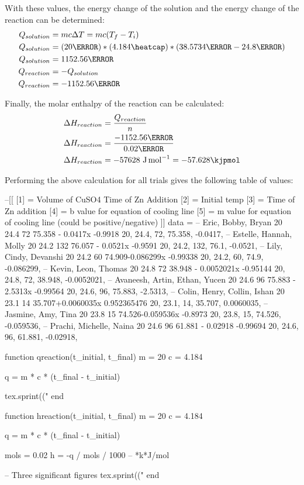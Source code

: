\documentclass[demo, 12pt, notitlepage, letterpaper]{report}
\begin{document}
With these values, the energy change of the solution and the energy change of the reaction can be determined:
\begin{align*}
	Q_{solution} & = mc\Delta T = mc(T_f - T_i)
	\\
	Q_{solution} & = (20\gram) * (4.184\heatcap) * (38.5734\celsius - 24.8\celsius)
	\\
	Q_{solution} & = 1152.56\joule
	\\
	Q_{reaction} & = -Q_{solution}
	\\
	Q_{reaction} & = -1152.56\joule
\end{align*}

Finally, the molar enthalpy of the reaction can be calculated:
\begin{align*}
	\Delta H_{reaction} & = \frac{Q_{reaction}}{n}                        \\
	\Delta H_{reaction} & = \frac{-1152.56\joule}{0.02\mol}               \\
	\Delta H_{reaction} & = -57628~\unit{\joule\per\mol} = -57.628\kjpmol
\end{align*}

Performing the above calculation for all trials gives the following table of values:

\begin{luacode*}
	--[[
			[1] = Volume of CuSO4 Time of Zn Addition
			[2] = Initial temp
			[3] = Time of Zn addition
			[4] = b value for equation of cooling line
			[5] = m value for equation of cooling line (could be positive/negative)
		]]
	data = {
		-- Eric, Bobby, Bryan	20	24.4	72	75.358 - 0.0417x	-0.9918
		{20, 24.4, 72, 75.358, -0.0417},
		-- Estelle, Hannah, Molly 	20	24.2	132	76.057 - 0.0521x	-0.9591
		{20, 24.2, 132, 76.1, -0.0521},
		-- Lily, Cindy, Devanshi	20	24.2	60	74.909-0.086299x	-0.99338
		{20, 24.2, 60, 74.9, -0.086299},
		-- Kevin, Leon, Thomas	20	24.8	72	38.948 - 0.0052021x	-0.95144
		{20, 24.8, 72, 38.948, -0.0052021},
		-- Avaneesh, Artin, Ethan, Yucen	20	24.6	96	75.883 - 2.5313x	-0.99564
		{20, 24.6, 96, 75.883, -2.5313},
		-- Colin, Henry, Collin, Ishan	20	23.1	14	35.707+0.0060035x	0.952365476
		{20, 23.1, 14, 35.707, 0.0060035},
		-- Jasmine, Amy, Tina	20	23.8	15	74.526-0.059536x	-0.8973
		{20, 23.8, 15, 74.526, -0.059536},
		-- Prachi, Michelle, Naina 	20	24.6	96	61.881 - 0.02918	-0.99694
		{20, 24.6, 96, 61.881, -0.02918},
	}

	function qreaction(t_initial, t_final)
	m = 20
	c = 4.184

	q = m * c * (t_final - t_initial)

	tex.sprint(("%
	end

	function hreaction(t_initial, t_final)
	m = 20
	c = 4.184

	q = m * c * (t_final - t_initial)

	mols = 0.02
	h = -q / mols / 1000 -- *k*J/mol

	-- Three significant figures
	tex.sprint(("%
	end
\end{luacode*}
\end{document}
